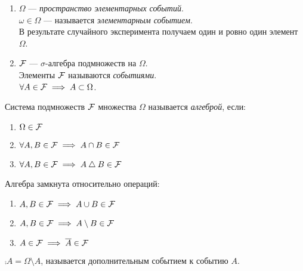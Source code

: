 \begin{enumerate}[label=\protect\circled{\arabic*},series=kolm_triple]

\item
	$\Omega$ --- \emph{пространство элементарных событий}.\\
	$\omega \in \Omega$ --- называется \emph{элементарным событием}.\\
	В результате случайного эксперимента получаем один и ровно один элемент $\Omega$.

\item
	$\mathcal{F}$ --- $\sigma$-алгебра подмножеств на $\Omega$.\\
	Элементы $\mathcal{F}$ называются \emph{событиями}.\\
	$\forall A \in \mathcal{F} \implies A \subset \Omega$.

\end{enumerate}

\begin{definition}
	Система подмножеств $\mathcal{F}$ множества $\Omega$ называется \emph{алгеброй}, если:

	\begin{enumerate}
		\item $\Omega \in \mathcal{F}$
		\item $\forall A,B \in \mathcal{F} \implies A \cap B \in \mathcal{F}$
		\item $\forall A,B \in \mathcal{F} \implies A \bigtriangleup B \in \mathcal{F}$\\
	\end{enumerate}

\end{definition}

\begin{exercise}
	Алгебра замкнута относительно операций:
	\begin{enumerate}
		\item $A, B \in \mathcal{F} \implies A \cup B \in \mathcal{F}$
		\item $A, B \in \mathcal{F} \implies A \setminus B \in \mathcal{F}$
		\item $A \in \mathcal{F} \implies \overline{A} \in \mathcal{F}$\\
	\end{enumerate}
\end{exercise}

\begin{definition}
 	$\comp{A} = \Omega \setminus A$, называется дополнительным событием к событию $A$.\\
\end{definition}

